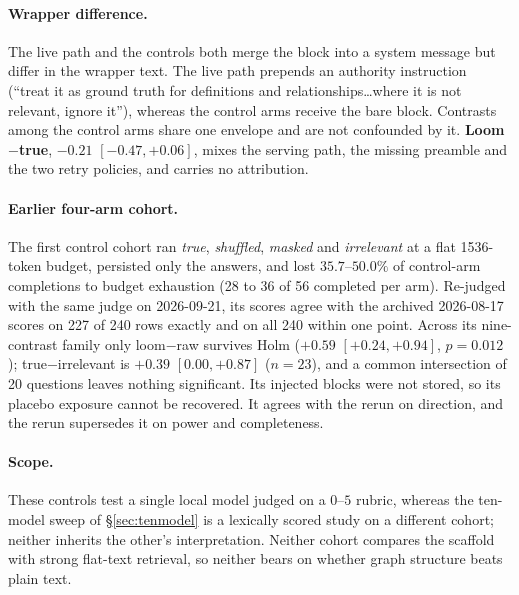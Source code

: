 \documentclass[10pt,twocolumn]{article}
\begin{document}
\paragraph{Wrapper difference.} The live path and the controls both merge the block into a system message but differ in the wrapper text. The live path prepends an authority instruction (``treat it as ground truth for definitions and relationships\ldots where it is not relevant, ignore it''), whereas the control arms receive the bare block. Contrasts among the control arms share one envelope and are not confounded by it. \textbf{Loom$-$true}, $-0.21$ $[-0.47,+0.06]$, mixes the serving path, the missing preamble and the two retry policies, and carries no attribution.

\paragraph{Earlier four-arm cohort.} The first control cohort ran \emph{true}, \emph{shuffled}, \emph{masked} and \emph{irrelevant} at a flat 1536-token budget, persisted only the answers, and lost $35.7$--$50.0\%$ of control-arm completions to budget exhaustion (28 to 36 of 56 completed per arm). Re-judged with the same judge on 2026-09-21, its scores agree with the archived 2026-08-17 scores on 227 of 240 rows exactly and on all 240 within one point. Across its nine-contrast family only loom$-$raw survives Holm ($+0.59$ $[+0.24,+0.94]$, $p=0.012$); true$-$irrelevant is $+0.39$ $[0.00,+0.87]$ ($n=23$), and a common intersection of 20 questions leaves nothing significant. Its injected blocks were not stored, so its placebo exposure cannot be recovered. It agrees with the rerun on direction, and the rerun supersedes it on power and completeness.

\paragraph{Scope.} These controls test a single local model judged on a $0$--$5$ rubric, whereas the ten-model sweep of \S\ref{sec:tenmodel} is a lexically scored study on a different cohort; neither inherits the other's interpretation. Neither cohort compares the scaffold with strong flat-text retrieval, so neither bears on whether graph structure beats plain text.
\end{document}
